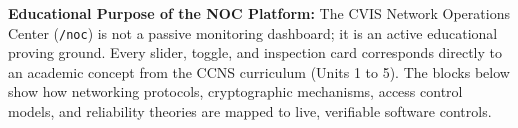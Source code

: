 \documentclass[10pt,a4paper]{article}
\begin{document}
\vspace{-6pt}
\begin{tcolorbox}[colback=purple!2, colframe=cvispurple!40, boxrule=0.8pt, arc=3pt, left=8pt, right=8pt, top=4pt, bottom=4pt]
    \textbf{\footnotesize Educational Purpose of the NOC Platform:} The CVIS Network Operations Center (\texttt{/noc}) is not a passive monitoring dashboard; it is an active educational proving ground. Every slider, toggle, and inspection card corresponds directly to an academic concept from the CCNS curriculum (Units 1 to 5). The blocks below show how networking protocols, cryptographic mechanisms, access control models, and reliability theories are mapped to live, verifiable software controls.
\end{tcolorbox}

\vspace{6pt}
\end{document}
